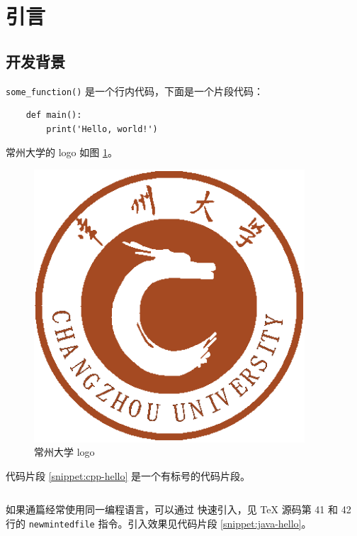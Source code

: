 \documentclass[a4paper, 11pt]{article}
\newcommand{\codeinline}{\texttt}
\begin{document}
\clearpage
\section{引言}

\subsection{开发背景}

\codeinline{some_function()} 是一个行内代码，下面是一个片段代码：

\begin{verbatim}
    def main():
        print('Hello, world!')
\end{verbatim}

常州大学的 logo 如图 \ref{fig:cczu}。

\begin{figure}[htp]
	\centering\includegraphics[width=0.9\textwidth]{cczu}
	\caption{常州大学 logo}
	\label{fig:cczu}
\end{figure}

代码片段 \ref{snippet:cpp-hello} 是一个有标号的代码片段。

\begin{snippet}
	\inputminted{cpp}{snippets/main.cpp}
	\caption{C++ 的 Hello World 小程序}
	\label{snippet:cpp-hello}
\end{snippet}

如果通篇经常使用同一编程语言，可以通过 \codeinline{} 快速引入，见 TeX 源码第 41 和 42 行的 \codeinline{newmintedfile} 指令。引入效果见代码片段 \ref{snippet:java-hello}。
\end{document}
